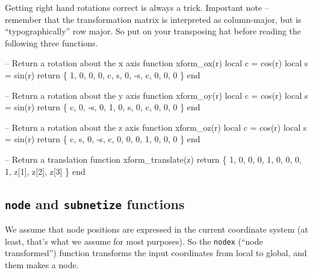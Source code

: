 Getting right hand rotations correct is always a trick.
Important note -- remember that the transformation matrix is
interpreted as column-major, but is ``typographically'' row
major.  So put on your transposing hat before reading the
following three functions.

\nwenddocs{}\plusendmoddef
-- Return a rotation about the x axis
function xform_ox(r)
  local c = cos(r)
  local s = sin(r)
  return \{ 1,   0,  0,
           0,   c,  s,
           0,  -s,  c,
           0,   0,  0 \}
end

\nwendcode{}\nwdocspar

\nwenddocs{}\plusendmoddef
-- Return a rotation about the y axis
function xform_oy(r)
  local c = cos(r)
  local s = sin(r)
  return \{ c,   0, -s,
           0,   1,  0,
           s,   0,  c,
           0,   0,  0 \}
end

\nwendcode{}\nwdocspar

\nwenddocs{}\plusendmoddef
-- Return a rotation about the z axis
function xform_oz(r)
  local c = cos(r)
  local s = sin(r)
  return \{ c,   s,  0,
          -s,   c,  0,
           0,   0,  1,
           0,   0,  0 \}
end

\nwendcode{}\nwdocspar

\nwenddocs{}\plusendmoddef
-- Return a translation 
function xform_translate(z)
  return \{ 1,    0,    0,
           0,    1,    0,
           0,    0,    1,
           z[1], z[2], z[3] \}
end

\nwendcode{}\nwdocspar


\subsection{{\tt{}node} and {\tt{}subnetize} functions}

We assume that node positions are expressed in the current coordinate
system (at least, that's what we assume for most purposes).
So the {\tt{}nodex} (``node transformed'') function transforms
the input coordinates from local to global, and them makes a node.

